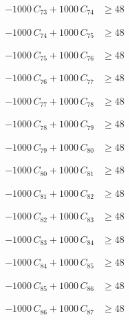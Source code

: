\documentclass[a4paper,11pt]{article}
\begin{document}
\begin{align}
-1000\,C_{73} + 1000\,C_{74} &\geq 48 \nonumber
\end{align}

\begin{align}
-1000\,C_{74} + 1000\,C_{75} &\geq 48 \nonumber
\end{align}

\begin{align}
-1000\,C_{75} + 1000\,C_{76} &\geq 48 \nonumber
\end{align}

\begin{align}
-1000\,C_{76} + 1000\,C_{77} &\geq 48 \nonumber
\end{align}

\begin{align}
-1000\,C_{77} + 1000\,C_{78} &\geq 48 \nonumber
\end{align}

\begin{align}
-1000\,C_{78} + 1000\,C_{79} &\geq 48 \nonumber
\end{align}

\begin{align}
-1000\,C_{79} + 1000\,C_{80} &\geq 48 \nonumber
\end{align}

\begin{align}
-1000\,C_{80} + 1000\,C_{81} &\geq 48 \nonumber
\end{align}

\begin{align}
-1000\,C_{81} + 1000\,C_{82} &\geq 48 \nonumber
\end{align}

\begin{align}
-1000\,C_{82} + 1000\,C_{83} &\geq 48 \nonumber
\end{align}

\begin{align}
-1000\,C_{83} + 1000\,C_{84} &\geq 48 \nonumber
\end{align}

\begin{align}
-1000\,C_{84} + 1000\,C_{85} &\geq 48 \nonumber
\end{align}

\begin{align}
-1000\,C_{85} + 1000\,C_{86} &\geq 48 \nonumber
\end{align}

\begin{align}
-1000\,C_{86} + 1000\,C_{87} &\geq 48 \nonumber
\end{align}
\end{document}
